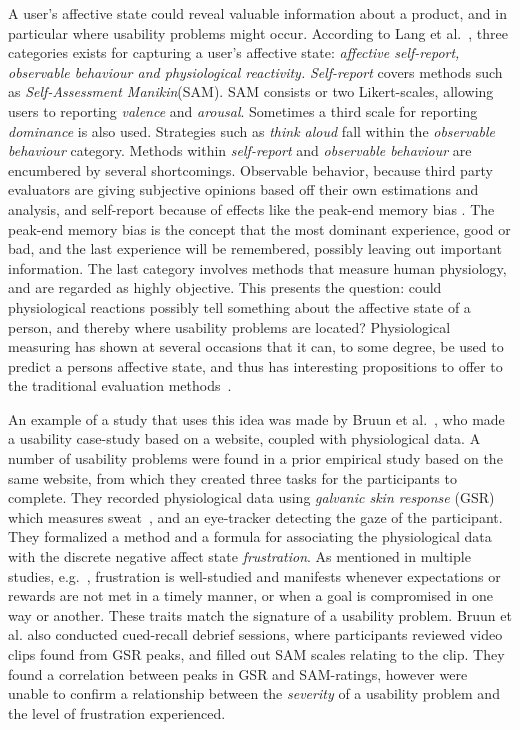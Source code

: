 A user's affective state could reveal valuable information about a product, and in particular where usability problems might occur. 
According to Lang et al.~\cite{BRADLEY199449}, three categories exists for capturing a user's affective state: \textit{affective
self-report, observable behaviour and physiological reactivity.}
\textit{Self-report} covers methods such as \textit{Self-Assessment Manikin}(SAM). SAM consists or two Likert-scales,
allowing users to reporting \textit{valence} and \textit{arousal}. Sometimes a third scale for reporting
\textit{dominance} is also used.
Strategies such as \textit{think aloud} fall within the \textit{observable behaviour} category.
Methods within \textit{self-report} and \textit{observable behaviour} are encumbered by several shortcomings.
Observable behavior, because third party evaluators are giving subjective opinions based off their own estimations and
analysis, and self-report because of effects like the peak-end memory bias \cite{cockburn_peakend}.
The peak-end memory bias is the concept that the most dominant experience, good or bad, and the last experience will be
remembered, possibly leaving out important information.
The last category involves methods that measure human physiology, and are regarded as highly objective.
This presents the question: could physiological reactions possibly tell something about the affective state of a person,
and thereby where usability problems are located?
Physiological measuring has shown at several occasions that it can, to some degree, be used to predict a persons
affective state, and thus has interesting propositions to offer to the traditional evaluation methods~\cite{eeg_facial_expressions,fusion4,90_percent_eeg_emotion}.

An example of a study that uses this idea was made by Bruun et al.~\cite{LH-paper}, who made a usability case-study
based on a website, coupled with physiological data.
A number of usability problems were found in a prior empirical study based on the same website, from which they created three tasks for the participants to complete.
They recorded physiological data using \textit{galvanic skin response} (GSR) which measures sweat~\cite{gsr_calibration}, and an eye-tracker detecting the gaze of the participant.
They formalized a method and a formula for associating the physiological data with the discrete negative affect state \textit{frustration}.
As mentioned in multiple studies, e.g.~\cite{LH-paper,frustration_with_computers}, frustration is well-studied
and manifests whenever expectations or rewards are not met in a timely manner, or when a goal is compromised in one way or another.
These traits match the signature of a usability problem.
Bruun et al. also conducted cued-recall debrief sessions, where participants reviewed video clips found from GSR peaks, and filled out SAM scales relating to the clip. 
They found a correlation between peaks in GSR and SAM-ratings, however were unable to confirm a relationship between the
\textit{severity} of a usability problem and the level of frustration experienced.

